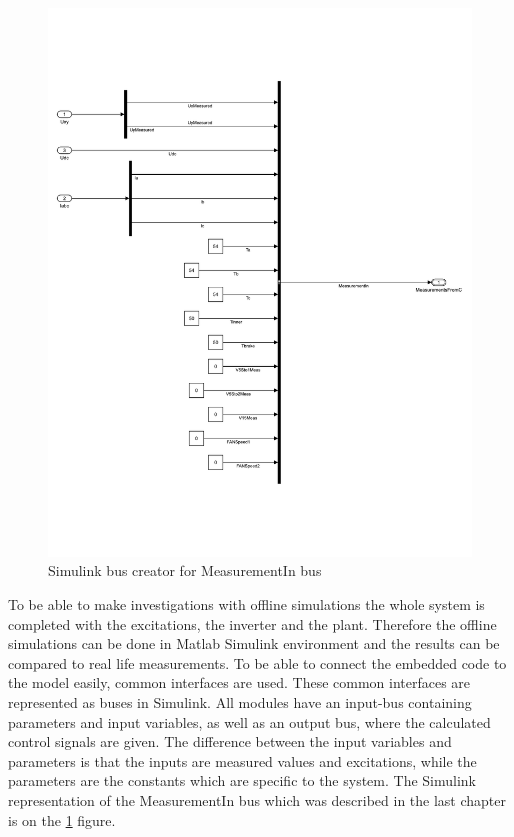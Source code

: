 \begin{figure}[!h]
\centering
\includegraphics[width=0.9\columnwidth]{figures/inputs}

\caption{Simulink bus creator for MeasurementIn bus}
\label{fig:fig_MeasurementIn}
\end{figure}

To be able to make investigations with offline simulations the whole system is completed with the excitations, the inverter and the plant. Therefore the offline simulations can be done in Matlab Simulink environment and the results can be compared to real life measurements. To be able to connect the embedded code to the model easily, common interfaces are used. These common interfaces are represented as buses in Simulink. All modules have an input-bus containing parameters and input variables, as well as an output bus, where the calculated control signals are given. The difference between the input variables and parameters is that the inputs are measured values and excitations, while the parameters are the constants which are specific to the system. The Simulink representation of the MeasurementIn bus which was described in the last chapter is on the \ref{fig:fig_MeasurementIn} figure.

